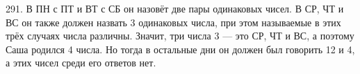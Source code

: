 291. В ПН с ПТ и ВТ с СБ он назовёт две пары одинаковых чисел. В СР, ЧТ и ВС он также должен назвать 3 одинаковых числа, при этом называемые в этих трёх случаях числа различны. Значит, три числа 3 --- это СР, ЧТ и ВС, а поэтому Саша родился 4 числа. Но тогда в остальные дни он должен был говорить 12 и 4, а этих чисел среди его ответов нет.\\
